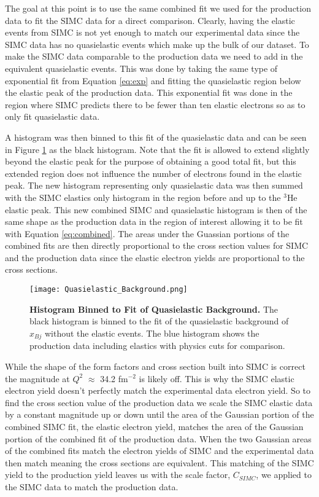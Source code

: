 The goal at this point is to use the same combined fit we used for the production data to fit the SIMC data for a direct comparison. Clearly, having the elastic events from SIMC is not yet enough to match our experimental data since the SIMC data has no quasielastic events which make up the bulk of our dataset. To make the SIMC data comparable to the production data we need to add in the equivalent quasielastic events. This was done by taking the same type of exponential fit from Equation \ref{eq:exp} and fitting the quasielastic region below the elastic peak of the production data. This exponential fit was done in the region where SIMC predicts there to be fewer than ten elastic electrons so as to only fit quasielastic data. 

A histogram was then binned to this fit of the quasielastic data and can be seen in Figure \ref{fig:QE_background} as the black histogram. Note that the fit is allowed to extend slightly beyond the elastic peak for the purpose of obtaining a good total fit, but this extended region does not influence the number of electrons found in the elastic peak. The new histogram representing only quasielastic data was then summed with the SIMC elastics only histogram in the region before and up to the $^3$He elastic peak. This new combined SIMC and quasielastic histogram is then of the same shape as the production data in the region of interest allowing it to be fit with Equation \ref{eq:combined}. The areas under the Guassian portions of the combined fits are then directly proportional to the cross section values for SIMC and the production data since the elastic electron yields are proportional to the cross sections. 

\begin{figure}[!ht]
\begin{center}
\texttt{[image: Quasielastic\_Background.png]}
\end{center}
\caption[Histogram Binned to Fit of Quasielastic Background]{
{\bf{Histogram Binned to Fit of Quasielastic Background.}} The black histogram is binned to the fit of the quasielastic background of $x_{Bj}$ without the elastic events. The blue histogram shows the production data including elastics with physics cuts for comparison.}
\label{fig:QE_background}
\end{figure}

While the shape of the form factors and cross section built into SIMC is correct the magnitude at $Q^2$ $\approx$ 34.2 fm$^{-2}$ is likely off. This is why the SIMC elastic electron yield doesn't perfectly match the experimental data electron yield. So to find the cross section value of the production data we scale the SIMC elastic data by a constant magnitude up or down until the area of the Gaussian portion of the combined SIMC fit, the elastic electron yield, matches the area of the Gaussian portion of the combined fit of the production data. When the two Gaussian areas of the combined fits match the electron yields of SIMC and the experimental data then match meaning the cross sections are equivalent. This matching of the SIMC yield to the production yield leaves us with the scale factor, $C_{SIMC}$, we applied to the SIMC data to match the production data. 

